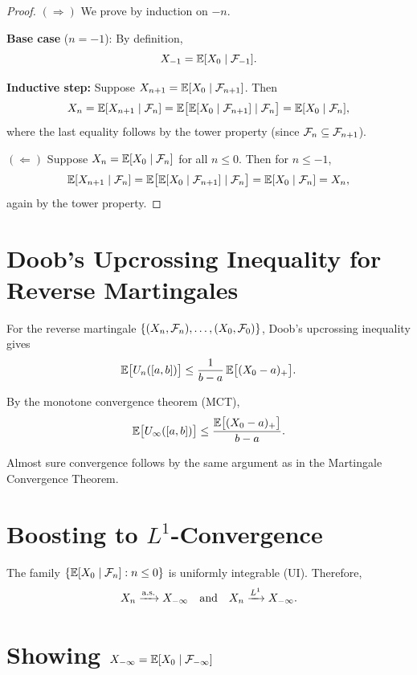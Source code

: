 \begin{proof}
    $(\Rightarrow)$ We prove by induction on $-n$.

    \textbf{Base case} ($n = -1$): By definition,
    \[
        X_{-1} = \mathbb{E}[X_0 \mid \mathcal{F}_{-1}].
    \]

    \textbf{Inductive step:} Suppose $X_{n+1} = \mathbb{E}[X_0 \mid \mathcal{F}_{n+1}]$. Then
    \[
        X_n = \mathbb{E}[X_{n+1} \mid \mathcal{F}_n] = \mathbb{E}\bigl[\mathbb{E}[X_0 \mid \mathcal{F}_{n+1}] \mid \mathcal{F}_n\bigr] = \mathbb{E}[X_0 \mid \mathcal{F}_n],
    \]
    where the last equality follows by the tower property (since $\mathcal{F}_n \subseteq \mathcal{F}_{n+1}$).

    \medskip
    $(\Leftarrow)$ Suppose $X_n = \mathbb{E}[X_0 \mid \mathcal{F}_n]$ for all $n \leq 0$. Then for $n \leq -1$,
    \[
        \mathbb{E}[X_{n+1} \mid \mathcal{F}_n] = \mathbb{E}\bigl[\mathbb{E}[X_0 \mid \mathcal{F}_{n+1}] \mid \mathcal{F}_n\bigr] = \mathbb{E}[X_0 \mid \mathcal{F}_n] = X_n,
    \]
    again by the tower property.
\end{proof}

\section{Doob's Upcrossing Inequality for Reverse Martingales}

For the reverse martingale $\{(X_n, \mathcal{F}_n), \ldots, (X_0, \mathcal{F}_0)\}$, Doob's upcrossing inequality gives
\[
    \mathbb{E}\bigl[U_n([a,b])\bigr] \leq \frac{1}{b - a}\,\mathbb{E}\bigl[(X_0 - a)_+\bigr].
\]

By the monotone convergence theorem (MCT),
\[
    \mathbb{E}\bigl[U_\infty([a,b])\bigr] \leq \frac{\mathbb{E}\bigl[(X_0 - a)_+\bigr]}{b - a}.
\]

Almost sure convergence follows by the same argument as in the Martingale Convergence Theorem.

\section{Boosting to \texorpdfstring{$L^1$}{L1}-Convergence}

The family $\{\mathbb{E}[X_0 \mid \mathcal{F}_n] : n \leq 0\}$ is uniformly integrable (UI). Therefore,
\[
    X_n \xrightarrow{\text{a.s.}} X_{-\infty} \quad \text{and} \quad X_n \xrightarrow{L^{1}} X_{-\infty}.
\]

\section{Showing \texorpdfstring{$X_{-\infty} = \mathbb{E}[X_0 \mid \mathcal{F}_{-\infty}]$}{X = E[X0|F-infty]}}

